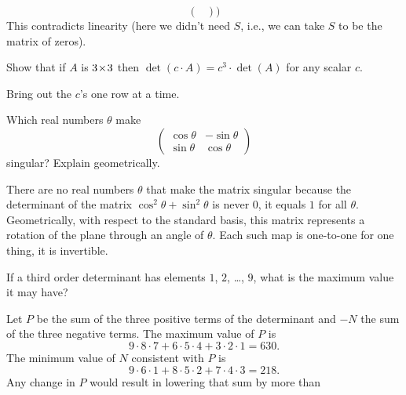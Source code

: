 \begin{exercises}
\begin{answer}
\begin{equation*}
\begin{pmatrix}
         \end{pmatrix})
      \end{equation*}
      This contradicts linearity (here we didn't need \( S \), i.e., we can 
      take $S$ to be the matrix of zeros).  
    \end{answer}
  \item 
    Show that if \( A \) is \( 3 \! \times \! 3 \) then
    \( \det(c\cdot A)=c^3\cdot \det(A) \) for any scalar \( c \).
    \begin{answer}
       Bring out the \( c \)'s one row at a time.  
    \end{answer}
  \item 
    Which real numbers \( \theta \) make
    \begin{equation*}
       \begin{pmatrix}
          \cos\theta  &-\sin\theta  \\
          \sin\theta  &\cos\theta
       \end{pmatrix}
    \end{equation*}
    singular?
    Explain geometrically.
    \begin{answer}
      There are no real numbers \( \theta \) that make the matrix singular 
      because the determinant of the matrix
      \( \cos^2\theta+\sin^2\theta \) is never $0$, it equals $1$
      for all $\theta$.
      Geometrically, with respect to the standard basis,
      this matrix represents
      a rotation of the plane through an angle of \( \theta \).
      Each such map is one-to-one \Dash  for one thing, it is invertible.  
    \end{answer}
  \puzzle \item  
    If a third order determinant has elements
    \( 1 \), \( 2 \), \ldots, \( 9 \), what is the maximum value it may
    have?
    \cite{Monthly55p257}
    \begin{answer}
      \answerasgiven
      Let \( P \) be the sum of the three positive terms of the determinant
      and \( -N \) the sum of the three negative terms.
      The maximum value of \( P \) is
      \begin{equation*}
        9\cdot 8\cdot 7 +6\cdot 5\cdot 4 +3\cdot 2\cdot 1=630.
      \end{equation*}
      The minimum value of \( N \) consistent with \( P \) is
      \begin{equation*}
        9\cdot 6\cdot 1 +8\cdot 5\cdot 2 +7\cdot 4\cdot 3=218.
      \end{equation*}
      Any change in \( P \) would result in lowering that sum by more than

\end{answer}
\end{exercises}
